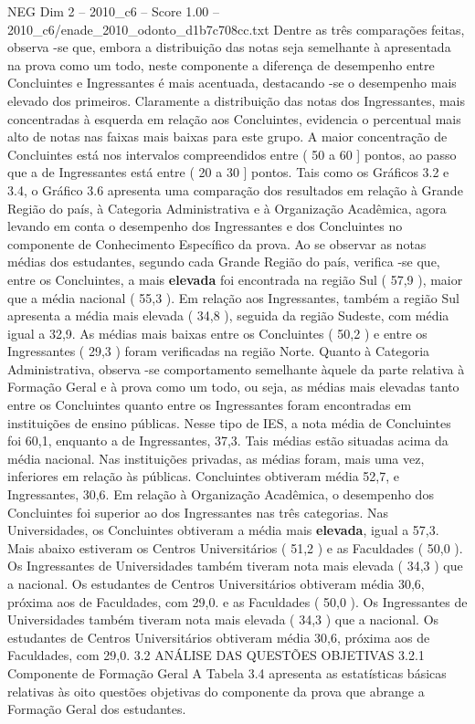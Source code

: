 \begin{textsample}{NEG Dim 2 – 2010\_c6 – Score 1.00 – 2010\_c6/enade\_2010\_odonto\_d1b7c708cc.txt}
Dentre as três comparações feitas, observa -se que, embora a distribuição das notas seja semelhante à apresentada na prova como um todo, neste componente a diferença de desempenho entre Concluintes e Ingressantes é mais acentuada, destacando -se o desempenho mais elevado dos primeiros.
Claramente a distribuição das notas dos Ingressantes, mais concentradas à esquerda em relação aos Concluintes, evidencia o percentual mais alto de notas nas faixas mais baixas para este grupo.
A maior concentração de Concluintes está nos intervalos compreendidos entre ( 50 a 60 ] pontos, ao passo que a de Ingressantes está entre ( 20 a 30 ] pontos.
Tais como os Gráficos 3.2 e 3.4, o Gráfico 3.6 apresenta uma comparação dos resultados em relação à Grande Região do país, à Categoria Administrativa e à Organização Acadêmica, agora levando em conta o desempenho dos Ingressantes e dos Concluintes no componente de Conhecimento Específico da prova.
Ao se observar as notas médias dos estudantes, segundo cada Grande Região do país, verifica -se que, entre os Concluintes, a mais \textbf{elevada} foi encontrada na região Sul ( 57,9 ), maior que a média nacional ( 55,3 ).
Em relação aos Ingressantes, também a região Sul apresenta a média mais elevada ( 34,8 ), seguida da região Sudeste, com média igual a 32,9.
As médias mais baixas entre os Concluintes ( 50,2 ) e entre os Ingressantes ( 29,3 ) foram verificadas na região Norte.
Quanto à Categoria Administrativa, observa -se comportamento semelhante àquele da parte relativa à Formação Geral e à prova como um todo, ou seja, as médias mais elevadas tanto entre os Concluintes quanto entre os Ingressantes foram encontradas em instituições de ensino públicas.
Nesse tipo de IES, a nota média de Concluintes foi 60,1, enquanto a de Ingressantes, 37,3.
Tais médias estão situadas acima da média nacional.
Nas instituições privadas, as médias foram, mais uma vez, inferiores em relação às públicas.
Concluintes obtiveram média 52,7, e Ingressantes, 30,6.
Em relação à Organização Acadêmica, o desempenho dos Concluintes foi superior ao dos Ingressantes nas três categorias.
Nas Universidades, os Concluintes obtiveram a média mais \textbf{elevada}, igual a 57,3.
Mais abaixo estiveram os Centros Universitários ( 51,2 ) e as Faculdades ( 50,0 ).
Os Ingressantes de Universidades também tiveram nota mais elevada ( 34,3 ) que a nacional.
Os estudantes de Centros Universitários obtiveram média 30,6, próxima aos de Faculdades, com 29,0. e as Faculdades ( 50,0 ).
Os Ingressantes de Universidades também tiveram nota mais elevada ( 34,3 ) que a nacional.
Os estudantes de Centros Universitários obtiveram média 30,6, próxima aos de Faculdades, com 29,0. 3.2 ANÁLISE DAS QUESTÕES OBJETIVAS 3.2.1 Componente de Formação Geral A Tabela 3.4 apresenta as estatísticas básicas relativas às oito questões objetivas do componente da prova que abrange a Formação Geral dos estudantes.

\end{textsample}
